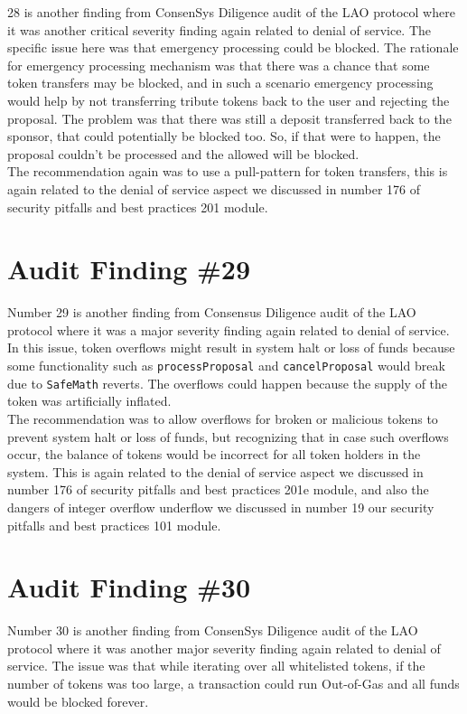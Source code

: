 28 is another finding from ConsenSys Diligence audit of the LAO protocol where it was another critical severity finding again related to denial of service. The specific issue here was that emergency processing could be blocked. The rationale for emergency processing mechanism was that there was a chance that some token transfers may be blocked, and in such a scenario emergency processing would help by not transferring tribute tokens back to the user and rejecting the proposal. The problem was that there was still a deposit transferred back to the sponsor, that could potentially be blocked too. So, if that were to happen, the proposal couldn't be processed and the allowed will be blocked.\\

The recommendation again was to use a pull-pattern for token transfers, this is again related to the denial of service aspect we discussed in number 176 of security pitfalls and best practices 201 module.

\section{Audit Finding \#29}

Number 29 is another finding from Consensus Diligence audit of the LAO protocol where it was a major severity finding again related to denial of service. In this issue, token overflows might result in system halt or loss of funds because some functionality such as \verb|processProposal| and \verb|cancelProposal| would break due to \verb|SafeMath| reverts. The overflows could happen because the supply of the token was artificially inflated.\\

The recommendation was to allow overflows for broken or malicious tokens to prevent system halt or loss of funds, but recognizing that in case such overflows occur, the balance of tokens would be incorrect for all token holders in the system. This is again related to the denial of service aspect we discussed in number 176 of security pitfalls and best practices 201e module, and also the dangers of integer overflow underflow we discussed in number 19 our security pitfalls and best practices 101 module.

\section{Audit Finding \#30}

Number 30 is another finding from ConsenSys Diligence audit of the LAO protocol where it was another major severity finding again related to denial of service. The issue was that while iterating over all whitelisted tokens, if the number of tokens was too large, a transaction could run Out-of-Gas and all funds would be blocked forever.\\

